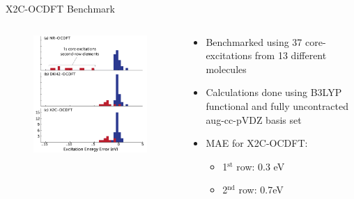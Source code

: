 \documentclass[t]{beamer}
\begin{document}
\begin{frame}{X2C-OCDFT Benchmark}
\begin{columns}
\begin{column}{0.5\textwidth}
\begin{figure}
\centering
\includegraphics[scale=0.75]{figure_3.pdf}
\end{figure}
\end{column}
\begin{column}{0.5\textwidth}
\begin{itemize}
\item Benchmarked using 37 core-excitations from 13 different molecules
\item Calculations done using B3LYP functional and fully uncontracted aug-cc-pVDZ basis set
\item MAE for X2C-OCDFT:
		\begin{itemize}
		\item 1$^{\text{st}}$ row: 0.3 eV
		\item 2$^{\text{nd}}$ row: 0.7eV
		\end{itemize}
\end{itemize}
\end{column}
\end{columns}
\end{frame}
\end{document}
